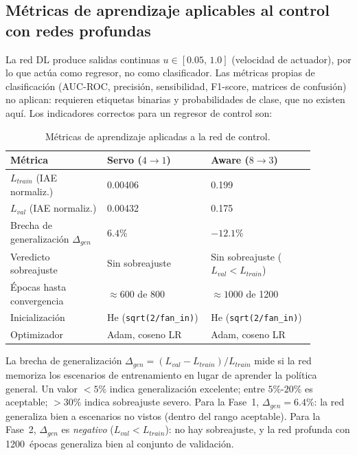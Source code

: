 


\subsection*{Métricas de aprendizaje aplicables al control con redes profundas}

La red DL produce salidas continuas $u\in[0.05,\,1.0]$ (velocidad de actuador), por lo que actúa como regresor, no como clasificador. Las métricas propias de clasificación (AUC-ROC, precisión, sensibilidad, F1-score, matrices de confusión) no aplican: requieren etiquetas binarias y probabilidades de clase, que no existen aquí. Los indicadores correctos para un regresor de control son:

\begin{table}[H]
\centering
\caption{Métricas de aprendizaje aplicadas a la red de control.}
\label{tab:ml_metrics}
\begin{tabular}{@{}P{0.28\linewidth}P{0.30\linewidth}P{0.30\linewidth}@{}}
\toprule
Métrica & Servo ($4{\to}1$) & Aware ($8{\to}3$) \\ \midrule
$L_{train}$ (IAE normaliz.) & 0.00406 & 0.199 \\
$L_{val}$ (IAE normaliz.)   & 0.00432 & 0.175 \\
Brecha de generalización $\Delta_{gen}$ & $\mathbf{6.4\%}$ & $-12.1\%$ \\
Veredicto sobreajuste & Sin sobreajuste & Sin sobreajuste ($L_{val}<L_{train}$) \\
Épocas hasta convergencia & $\approx 600$ de 800 & $\approx 1000$ de 1200 \\
Inicialización & He (\texttt{sqrt(2/fan\_in)}) & He (\texttt{sqrt(2/fan\_in)}) \\
Optimizador & Adam, coseno LR & Adam, coseno LR \\
\bottomrule
\end{tabular}
\end{table}

La brecha de generalización $\Delta_{gen}=\left(L_{val}-L_{train}\right)/L_{train}$ mide si la red memoriza los escenarios de entrenamiento en lugar de aprender la política general. Un valor $<5\%$ indica generalización excelente; entre $5\%$-$20\%$ es aceptable; $>30\%$ indica sobreajuste severo. Para la Fase~1, $\Delta_{gen}=6.4\%$: la red generaliza bien a escenarios no vistos (dentro del rango aceptable). Para la Fase~2, $\Delta_{gen}$ es \emph{negativo} ($L_{val}<L_{train}$): no hay sobreajuste, y la red profunda con 1200~épocas generaliza bien al conjunto de validación.

